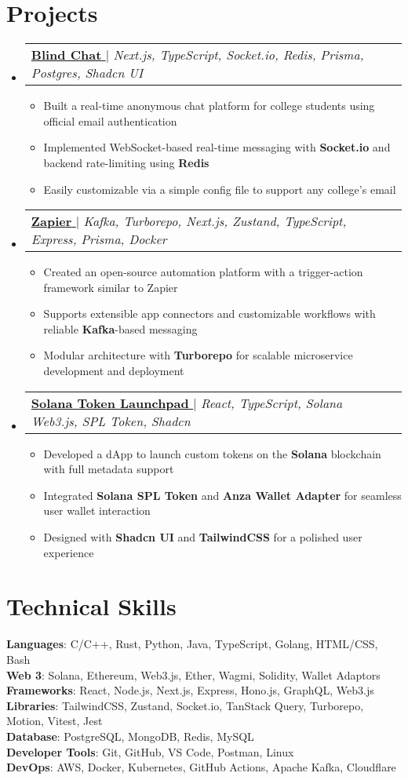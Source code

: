 \documentclass[a4paper,11pt]{article}
\makeatletter
\newcommand{\resumeItem}[1]{
  \item\small{{#1 \vspace{-2pt}}}
}
\newcommand{\resumeProjectHeading}[2]{
    \item
    \begin{tabular*}{0.97\textwidth}{l@{\extracolsep{\fill}}r}
      \small#1 & #2 \\
    \end{tabular*}\vspace{-7pt}
}
\newcommand{\resumeItemListStart}{\begin{itemize}}
\newcommand{\resumeItemListEnd}{\end{itemize}\vspace{-5pt}}
\newcommand{\resumeSubHeadingListStart}{\begin{itemize}[leftmargin=0.15in, label={}]}
\newcommand{\resumeSubHeadingListEnd}{\end{itemize}}
\newcommand{\projectLink}[3]{\href{#2}{\textbf{#1} \faExternalLink} $|$ \emph{#3}}
\makeatother
\begin{document}
\section{Projects}
\resumeSubHeadingListStart
  \resumeProjectHeading{\projectLink{Blind Chat}{https://blind-curaj.vercel.app/}{Next.js, TypeScript, Socket.io, Redis, Prisma, Postgres, Shadcn UI}}{}
    \resumeItemListStart
      \resumeItem{Built a real-time anonymous chat platform for college students using official email authentication}
      \resumeItem{Implemented WebSocket-based real-time messaging with \textbf{Socket.io} and backend rate-limiting using \textbf{Redis}}
      \resumeItem{Easily customizable via a simple config file to support any college's email}
    \resumeItemListEnd
  \resumeProjectHeading{\projectLink{Zapier}{https://github.com/idityaGE/_zapier}{Kafka, Turborepo, Next.js, Zustand, TypeScript, Express, Prisma, Docker}}{}
    \resumeItemListStart
      \resumeItem{Created an open-source automation platform with a trigger-action framework similar to Zapier}
      \resumeItem{Supports extensible app connectors and customizable workflows with reliable \textbf{Kafka}-based messaging}
      \resumeItem{Modular architecture with \textbf{Turborepo} for scalable microservice development and deployment}
    \resumeItemListEnd
  \resumeProjectHeading{\projectLink{Solana Token Launchpad}{https://solana-token-lauchpad.vercel.app/}{React, TypeScript, Solana Web3.js, SPL Token, Shadcn}}{}
    \resumeItemListStart
      \resumeItem{Developed a dApp to launch custom tokens on the \textbf{Solana} blockchain with full metadata support}
      \resumeItem{Integrated \textbf{Solana SPL Token} and \textbf{Anza Wallet Adapter} for seamless user wallet interaction}
      \resumeItem{Designed with \textbf{Shadcn UI} and \textbf{TailwindCSS} for a polished user experience}
    \resumeItemListEnd
\resumeSubHeadingListEnd

\section{Technical Skills}
\begin{itemize}[leftmargin=0.15in, label={}]
  \small{\item{
    \textbf{Languages}{: C/C++, Rust, Python, Java, TypeScript, Golang, HTML/CSS, Bash} \\
    \textbf{Web 3}{: Solana, Ethereum, Web3.js, Ether, Wagmi, Solidity, Wallet Adaptors} \\
    \textbf{Frameworks}{: React, Node.js, Next.js, Express, Hono.js, GraphQL, Web3.js} \\
    \textbf{Libraries}{: TailwindCSS, Zustand, Socket.io, TanStack Query, Turborepo, Motion, Vitest, Jest} \\
    \textbf{Database}{: PostgreSQL, MongoDB, Redis, MySQL} \\
    \textbf{Developer Tools}{: Git, GitHub, VS Code, Postman, Linux} \\
    \textbf{DevOps}{: AWS, Docker, Kubernetes, GitHub Actions, Apache Kafka, Cloudflare}
  }}
\end{itemize}
\end{document}
